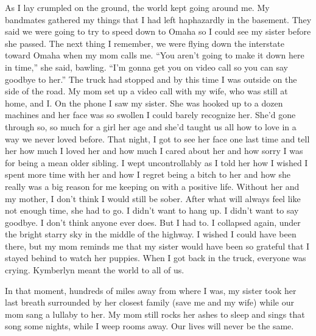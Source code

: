 \documentclass[12pt, letterpaper]{article}
\begin{document}
\begin{flushleft}
As I lay crumpled on the ground,
the world kept going around me.
My bandmates gathered my things
that I had left haphazardly in the basement.
They said we were going to try to speed down to Omaha
so I could see my sister before she passed.
The next thing I remember, we were flying down the 
interstate toward Omaha when my mom calls me.
``You aren't going to make it down here in time,\@''
she said, bawling.
``I'm gonna get you on video call so you can say goodbye to her.\@''
The truck had stopped and by this time I was outside on the side of the road.
My mom set up a video call with my wife, who was still at home, and I.
On the phone I saw my sister.
She was hooked up to a dozen machines and
her face was so swollen I could barely recognize her.
She'd gone through so, so much for a girl her age and
she'd taught us all how to love in a way we never loved before.
That night, I got to see her face one last time and tell her how much
I loved her and how much I cared about her and how sorry
I was for being a mean older sibling.
I wept uncontrollably as I told her how I wished I spent more time with her
and how I regret being a bitch to her and how she really
was a big reason for me keeping on with a positive life.
Without her and my mother, I don’t think I would still be sober.
After what will always feel like not enough time,
she had to go.
I didn’t want to hang up.
I didn’t want to say goodbye.
I don’t think anyone ever does.
But I had to.
I collapsed again, under the bright starry sky in the middle of the highway.
I wished I could have been there, but my mom reminds me that my
sister would have been so grateful that I stayed behind to watch her puppies.
When I got back in the truck, 
everyone was crying.
Kymberlyn meant the world to all of us. 
\vspace{5mm}


In that moment, hundreds of miles away from where I was,
my sister took her last breath surrounded by her closest family
(save me and my wife) while our mom sang a lullaby to her.
My mom still rocks her ashes to sleep and sings that song some nights,
while I weep rooms away.
Our lives will never be the same.






\end{flushleft}
\end{document}
